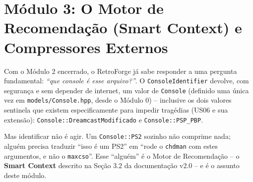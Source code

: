 \section{Módulo 3: O Motor de Recomendação (Smart Context) e Compressores Externos}

Com o Módulo 2 encerrado, o RetroForge já sabe responder a uma pergunta fundamental: \textit{``que console é esse arquivo?''}.
O \texttt{ConsoleIdentifier} devolve, com segurança e sem depender de internet, um valor de \texttt{Console} (definido uma única vez em \texttt{models/Console.hpp}, desde o Módulo 0) -- inclusive os dois valores sentinela que existem especificamente para impedir tragédias (US06 e sua extensão): \texttt{Console::DreamcastModificado} e \texttt{Console::PSP\_PBP}.

Mas identificar não é agir. Um \texttt{Console::PS2} sozinho não comprime nada;
alguém precisa traduzir ``isso é um PS2'' em ``rode o \texttt{chdman} com estes argumentos, e não o \texttt{maxcso}''.
Esse ``alguém'' é o Motor de Recomendação -- o \textbf{Smart Context} descrito na Seção 3.2 da documentação v2.0 -- e é o assunto deste módulo.

